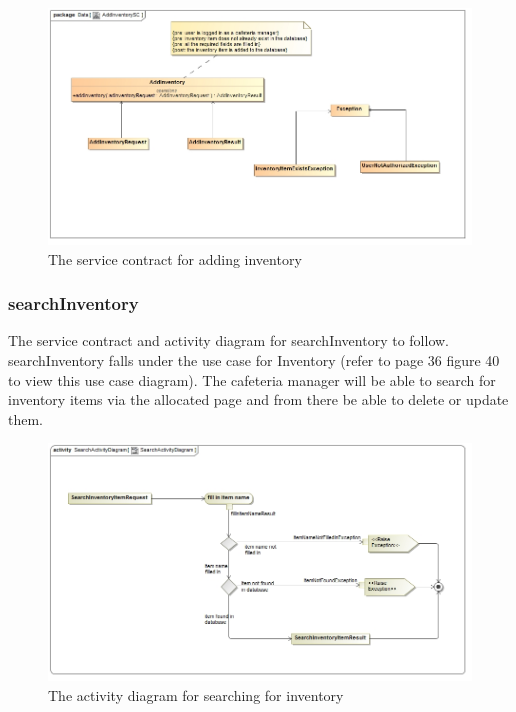 \documentclass[a4paper,12pt]{report}
\begin{document}
\begin{figure}[H]
	\centering
	\includegraphics[width=1.0\textwidth]{../images/AddInventorySC.jpg}
	\caption{The service contract for adding inventory}
\end{figure}

\subsubsection{searchInventory}
The service contract and activity diagram for searchInventory to follow. searchInventory falls under the use case for Inventory (refer to page 36 figure 40 to view this use case diagram). The cafeteria manager will be able to search for inventory items via the allocated page and from there be able to delete or update them.
\begin{figure}[H]
  \centering
    \includegraphics[width=1.0\textwidth]{../images/SearchActivityDiagram.jpg}
    \caption{The activity diagram for searching for inventory} 
\end{figure}
\end{document}
